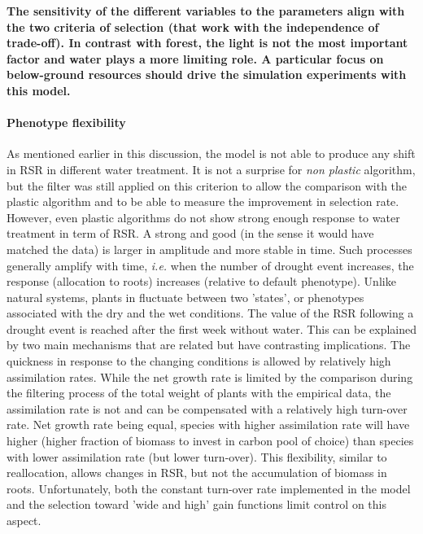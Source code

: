 
\textbf{The sensitivity of the different variables to the parameters align with the two criteria of selection (that work with the independence of trade-off). In contrast with forest, the light is not the most important factor and water plays a more limiting role. A particular focus on below-ground resources should drive the simulation experiments with this model.}


\paragraph{Phenotype flexibility}

As mentioned earlier in this discussion, the model is not able to produce any shift in RSR in different water treatment. It is not a surprise for \textit{non plastic} algorithm, but the filter was still applied on this criterion to allow the comparison with the plastic algorithm and to be able to measure the improvement in selection rate. However, even plastic algorithms do not show strong enough response to water treatment in term of RSR. A strong and good (in the sense it would have matched the data) is larger in amplitude and more stable in time. Such processes generally amplify with time, \textit{i.e.} when the number of drought event increases, the response (allocation to roots) increases (relative to default phenotype). Unlike natural systems, plants in \model fluctuate between two 'states', or phenotypes associated with the dry and the wet conditions. The value of the RSR following a drought event is reached after the first week without water. This can be explained by two main mechanisms that are related but have contrasting implications. The quickness in response to the changing conditions is allowed by relatively high assimilation rates. While the net growth rate is limited by the comparison during the filtering process of the total weight of plants with the empirical data, the assimilation rate is not and can be compensated with a relatively high turn-over rate. Net growth rate being equal, species with higher assimilation rate will have higher  (higher fraction of biomass to invest in carbon pool of choice) than species with lower assimilation rate (but lower turn-over). This flexibility, similar to reallocation, allows changes in RSR, but not the accumulation of biomass in roots. Unfortunately, both the constant turn-over rate implemented in the model and the selection toward 'wide and high' gain functions limit control on this aspect.

